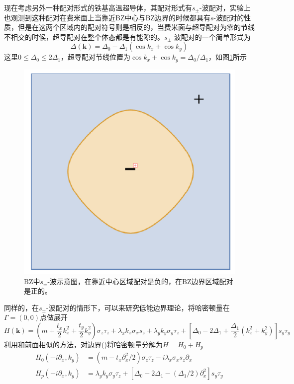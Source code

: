 \qquad 现在考虑另外一种配对形式的铁基高温超导体，其配对形式有$s_\pm$-波配对，实验上也观测到这种配对在费米面上当靠近BZ中心与BZ边界的时候都具有$s$-波配对的性质，但是在这两个区域内的配对符号则是相反的，当费米面与超导配对为零的节线不相交的时候，超导配对在整个体态都是有能隙的。$s_\pm$-波配对的一个简单形式为
\begin{equation}
\Delta(\mathbf{k})=\Delta_0-\Delta_1(\cos k_x+\cos k_y)
\end{equation}
这里$0\le\Delta_0\le2\Delta_1$，超导配对节线位置为$\cos k_x+\cos k_y=\Delta_0/\Delta_1$，如图\ref{fig10}所示
\begin{figure}[h]
\centering
\includegraphics[scale=0.5]{pic/fig11.png}
\caption{BZ中$s_\pm$-波示意图，在靠近中心区域配对是负的，在BZ边界区域配对是正的。}\label{fig10}
\end{figure}
同样的，在$s_\pm$-波配对的情形下，可以来研究低能边界理论，将哈密顿量在$\Gamma=(0,0)$点做展开
\begin{equation}
H(\mathbf{k})=(m+\frac{t_x}{2}k_x^2+\frac{t_y}{2}k_y^2)\sigma_z\tau_z+\lambda_xk_x\sigma_xs_z+\lambda_yk_y\sigma_y\tau_z+\left[\Delta_0-2\Delta_1+\frac{\Delta_1}{2}(k_x^2+k_y^2)\right]s_y\tau_y\label{hoti2s}
\end{equation}
利用和前面相似的方法，对边界(\uppercase\expandafter{})将哈密顿量分解为$H=H_0+H_p$
\begin{equation}
\begin{aligned}
H_0(-i\partial_x,k_y)&=(m-t_x\partial_x^2/2)\sigma_z\tau_z-i\lambda_x\sigma_xs_z\partial_x\\
H_p(-i\partial_x,k_y)&=\lambda_yk_y\sigma_y\tau_z+\left[\Delta_0-2\Delta_1-(\Delta_1/2)\partial_x^2\right]s_y\tau_y
\end{aligned}
\end{equation}
